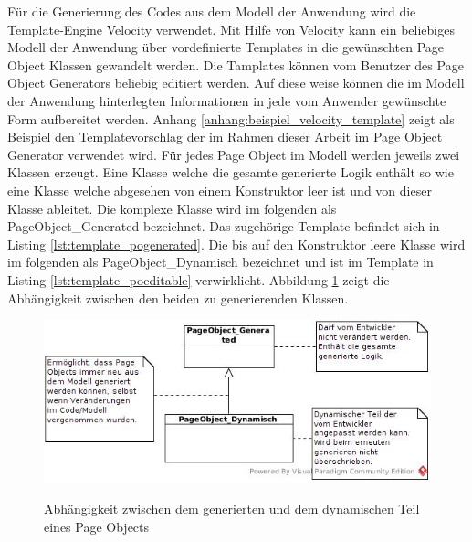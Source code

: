 Für die Generierung des Codes aus dem Modell der Anwendung wird die Template-Engine Velocity \cite{apache_software_foundation_apache_2015} verwendet.
Mit Hilfe von Velocity kann ein beliebiges Modell der Anwendung über vordefinierte Templates in die gewünschten Page Object Klassen gewandelt werden.
Die Tamplates können vom Benutzer des Page Object Generators beliebig editiert werden. Auf diese weise können die im Modell der Anwendung hinterlegten Informationen in jede vom Anwender gewünschte Form aufbereitet werden. Anhang \ref{anhang:beispiel_velocity_template} zeigt als Beispiel den Templatevorschlag der im Rahmen dieser Arbeit im Page Object Generator verwendet wird.
Für jedes Page Object im Modell werden jeweils zwei Klassen erzeugt. Eine Klasse welche die gesamte generierte Logik enthält so wie eine Klasse welche abgesehen von einem Konstruktor leer ist und von dieser Klasse ableitet. 
Die komplexe Klasse wird im folgenden als PageObject\_Generated bezeichnet. Das zugehörige Template befindet sich in Listing \ref{lst:template_pogenerated}. Die
bis auf den Konstruktor leere Klasse wird im folgenden als PageObject\_Dynamisch bezeichnet und ist im Template in Listing \ref{lst:template_poeditable} verwirklicht.
Abbildung \ref{fig:postruktur} zeigt die Abhängigkeit zwischen den beiden zu generierenden Klassen.

\begin{figure}[htb]
  \centering  
  \includegraphics[scale=0.6]{img/postruktur.jpg}\\
  \caption{Abhängigkeit zwischen dem generierten und dem dynamischen Teil eines Page Objects}
  \label{fig:postruktur}
\end{figure}
 
